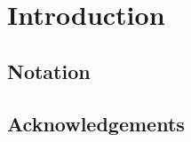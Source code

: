 \documentclass[../main.tex]{subfiles}
\begin{document}
\section{Introduction} %
\label{sec:Introduction}

\subsection{Notation} %
\label{sub:Notation}


\subsection{Acknowledgements} %
\label{sub:Acknowledgements}

\end{document}

